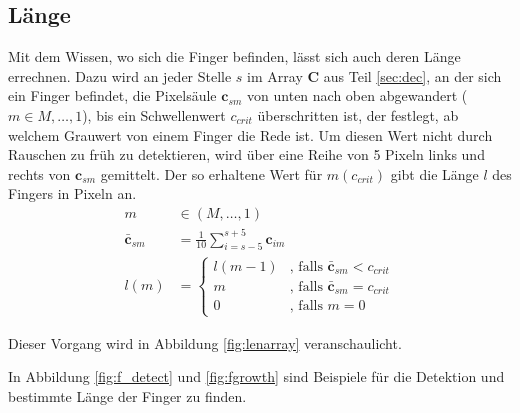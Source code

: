 \subsection{Länge}
\label{sec:lan}
Mit dem Wissen, wo sich die Finger befinden, lässt sich auch deren Länge errechnen. Dazu wird an jeder Stelle $s$ im Array $\mathbf{C}$ aus Teil \ref{sec:dec}, an der sich ein Finger befindet, die Pixelsäule $\mathbf{c}_{sm}$ von unten nach oben abgewandert ($m \in M, \dots, 1$), bis ein Schwellenwert $c_{crit}$ überschritten ist, der festlegt, ab welchem Grauwert von einem Finger die Rede ist. Um diesen Wert nicht durch Rauschen zu früh zu detektieren, wird über eine Reihe von 5 Pixeln links und rechts von $\mathbf{c}_{sm}$ gemittelt. Der so erhaltene Wert für $m(c_{crit})$ gibt die Länge $l$ des Fingers in Pixeln an.
\begin{equation}
\begin{aligned}
 m &\in (M,\dots,1) \\
 \bar{\mathbf{c}}_{sm} &= \frac{1}{10}\sum_{i=s-5}^{s+5} \mathbf{c}_{im} \\
 l(m) &=   \begin{cases}
	    l(m-1) & \text{, falls } \bar{\mathbf{c}}_{sm} < c_{crit}  \\
	    m      & \text{, falls } \bar{\mathbf{c}}_{sm} = c_{crit}  \\
	    0      & \text{, falls } m=0
	   \end{cases}
\end{aligned}
\end{equation}

Dieser Vorgang wird in Abbildung \ref{fig:lenarray} veranschaulicht.
 
In Abbildung \ref{fig:f_detect} und \ref{fig:fgrowth} sind Beispiele für die Detektion und bestimmte Länge der Finger zu finden.



